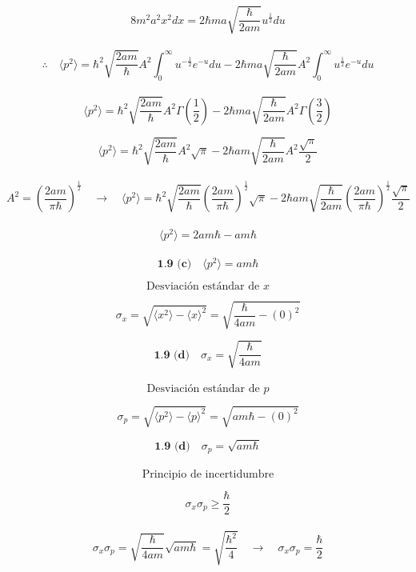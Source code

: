\documentclass[10pt,a4papper]{article}
\begin{document}
\[\boxed{8m^2a^2x^2dx=2\hbar ma\sqrt{\frac{\hbar}{2am}}u^\frac{1}{2}du}\]\\

\[\therefore\quad\langle p^2\rangle=
\hbar^2\sqrt{\frac{2am}{\hbar}}A^2\int_0^\infty u^{-\frac{1}{2}}e^{-u}du
-2\hbar ma\sqrt{\frac{\hbar}{2am}}A^2\int_0^\infty u^\frac{1}{2}e^{-u}du\]\\

\[\langle p^2\rangle=
\hbar^2\sqrt{\frac{2am}{\hbar}}A^2\Gamma\left(\frac{1}{2}\right)
-2\hbar ma\sqrt{\frac{\hbar}{2am}}A^2\Gamma\left(\frac{3}{2}\right)\]

\newpage
\[\langle p^2\rangle=
\hbar^2\sqrt{\frac{2am}{\hbar}}A^2\sqrt{\pi}-2\hbar am\sqrt{\frac{\hbar}{2am}}A^2\frac{\sqrt{\pi}}{2}\]\\

\[A^2=\left(\frac{2am}{\pi\hbar}\right)^\frac{1}{2}\quad\to\quad
\langle p^2\rangle=
\hbar^2\sqrt{\frac{2am}{\hbar}}\left(\frac{2am}{\pi\hbar}\right)^\frac{1}{2}\sqrt{\pi}
-2\hbar am\sqrt{\frac{\hbar}{2am}}\left(\frac{2am}{\pi\hbar}\right)^\frac{1}{2}\frac{\sqrt{\pi}}{2}\]\\

\[\langle p^2\rangle=2am\hbar-am\hbar\]\\

\[\boxed{\textbf{1.9 (c)}\quad\langle p^2\rangle=am\hbar}\]

\newpage
\[\text{Desviación estándar de }x\]

\[\sigma_x=\sqrt{\langle x^2\rangle-\langle x\rangle^2}=\sqrt{\frac{\hbar}{4am}-(0)^2}\]

\[\boxed{\textbf{1.9 (d)}\quad\sigma_x=\sqrt{\frac{\hbar}{4am}}}\]\\

\[\text{Desviación estándar de }p\]

\[\sigma_p=\sqrt{\langle p^2\rangle-\langle p\rangle^2}=\sqrt{am\hbar-(0)^2}\]

\[\boxed{\textbf{1.9 (d)}\quad\sigma_p=\sqrt{am\hbar}}\]\\

\[\text{Principio de incertidumbre}\]

\[\sigma_x\sigma_p\geq\frac{\hbar}{2}\]\\

\[\sigma_x\sigma_p=\sqrt{\frac{\hbar}{4am}}\sqrt{am\hbar}=\sqrt{\frac{\hbar^2}{4}}\quad\to\quad
\sigma_x\sigma_p=\frac{\hbar}{2}\]\\


\newpage

\newpage

\newpage

\newpage

\newpage

\newpage

\newpage

\newpage

\newpage
\end{document}
